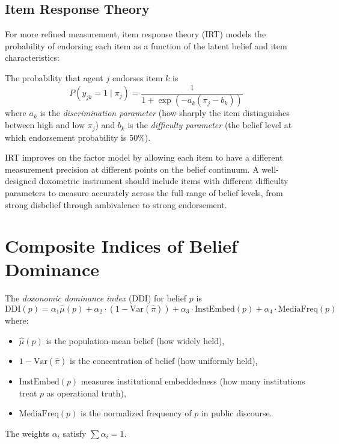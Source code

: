 \subsection{Item Response Theory}

For more refined measurement, item response theory (IRT) models the probability of endorsing each item as a function of the latent belief and item characteristics:

\begin{model}
\label{mod:irt}
The probability that agent $j$ endorses item $k$ is
\[
  P(y_{jk} = 1 \mid \pi_j) = \frac{1}{1 + \exp(-a_k(\pi_j - b_k))}
\]
where $a_k$ is the \emph{discrimination parameter} (how sharply the item distinguishes between high and low $\pi_j$) and $b_k$ is the \emph{difficulty parameter} (the belief level at which endorsement probability is 50\%).
\end{model}

IRT improves on the factor model by allowing each item to have a different measurement precision at different points on the belief continuum.
A well-designed doxometric instrument should include items with different difficulty parameters to measure accurately across the full range of belief levels, from strong disbelief through ambivalence to strong endorsement.


\section{Composite Indices of Belief Dominance}
\label{sec:ch13-composite}

\begin{definition}
\label{def:dominance-index}
The \emph{doxonomic dominance index} (DDI) for belief $p$ is
\[
  \mathrm{DDI}(p) = \alpha_1 \hat{\mu}(p) + \alpha_2 \cdot (1 - \mathrm{Var}(\hat{\pi})) + \alpha_3 \cdot \mathrm{InstEmbed}(p) + \alpha_4 \cdot \mathrm{MediaFreq}(p)
\]
where:
\begin{itemize}[nosep]
  \item $\hat{\mu}(p)$ is the population-mean belief (how widely held),
  \item $1 - \mathrm{Var}(\hat{\pi})$ is the concentration of belief (how uniformly held),
  \item $\mathrm{InstEmbed}(p)$ measures institutional embeddedness (how many institutions treat $p$ as operational truth),
  \item $\mathrm{MediaFreq}(p)$ is the normalized frequency of $p$ in public discourse.
\end{itemize}
The weights $\alpha_i$ satisfy $\sum \alpha_i = 1$.
\end{definition}

